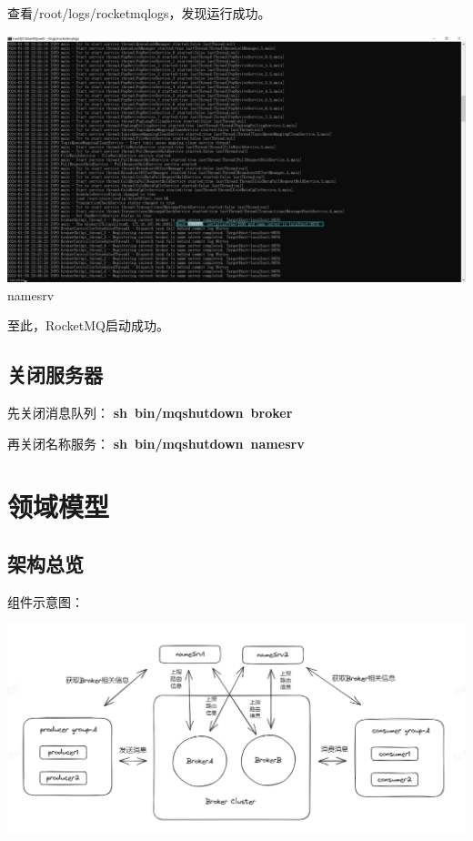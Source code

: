\documentclass[11pt, a4paper, oneside, fontset=none]{ctexbook}
\begin{document}
查看/root/logs/rocketmqlogs，发现运行成功。
\begin{center}
  \begin{minipage}{\textwidth}
    \center
    \includegraphics[width=\textwidth]{picture/broker启动成功.png}
    \captionsetup{hypcap=false}
    \label{fig:broker启动成功}namesrv
  \end{minipage}
\end{center}

至此，RocketMQ启动成功。

\section{关闭服务器}
先关闭消息队列：
{\bfseries\kaishu sh\  bin/mqshutdown\  broker}

再关闭名称服务：
{\bfseries\kaishu sh\  bin/mqshutdown\  namesrv}

\chapter{领域模型}
\section{架构总览}
组件示意图：
\begin{center}
  \begin{minipage}{\textwidth}
    \center
    \includegraphics[width=\textwidth]{picture/RocketMQ全局图.jpg}
    \captionsetup{hypcap=false}
    \label{fig:RocketMQ全局图}
  \end{minipage}
\end{center}
\end{document}
